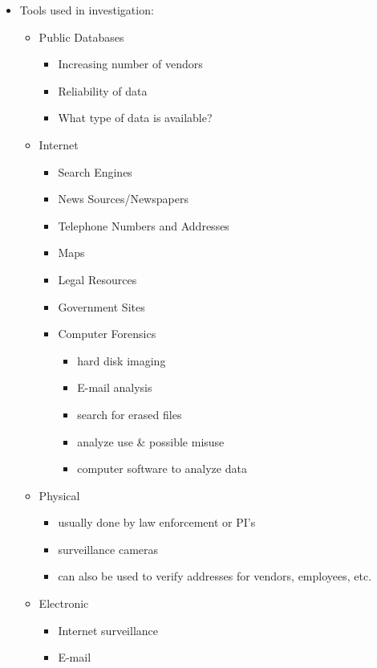 \begin{itemize}
\item{Tools used in investigation:}

\begin{itemize}
\item{Public Databases \cite{10}}
\begin{itemize}
\item Increasing number of vendors
\item Reliability of data
\item What type of data is available?
\end{itemize}

\item{Internet}
\begin{itemize}
\item Search Engines \cite{10}
\item News Sources/Newspapers
\item Telephone Numbers and Addresses
\item Maps
\item Legal Resources
\item Government Sites \cite{10}
\item Computer Forensics
\begin{itemize}
\item hard disk imaging
\item E-mail analysis
\item search for erased files
\item analyze use \& possible misuse
\item computer software to analyze data \cite{10}
\end{itemize}
\end{itemize}

\item{Physical}
\begin{itemize}
\item usually done by law enforcement or PI's
\item surveillance cameras
\item can also be used to verify addresses for vendors, employees, etc. \cite{10}
\end{itemize}


\item{Electronic}
\begin{itemize}
\item Internet surveillance
\item E-mail \cite{10}
\end{itemize}
\end{itemize}
\end{itemize}



